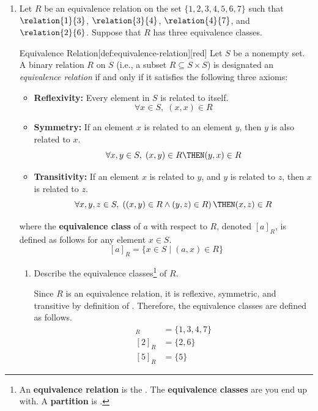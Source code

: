 \begin{enumerate}
  \newpage
  \item Let $R$ be an equivalence relation on the set $\{1,2,3,4,5,6,7\}$ 
  such that $\relation{1}{3}$, $\relation{3}{4}$, $\relation{4}{7}$, and 
  $\relation{2}{6}$. Suppose that $R$ has three equivalence classes.
  \begin{define}{Equivalence Relation}[def:equivalence-relation][red]
    Let $S$ be a nonempty set. A binary relation $R$ on $S$ (i.e., a subset $R \subseteq S \times S$) is designated an \emph{equivalence relation} if and only if it satisfies the following three axioms:
    \begin{itemize}
      \item \textbf{Reflexivity:} Every element in $S$ is related to itself.
        $$ \forall x \in S, \; (x,x) \in R $$
      \item \textbf{Symmetry:} If an element $x$ is related to an element $y$, then $y$ is also related to $x$.
        $$ \forall x,y \in S, \; (x,y) \in R \THEN (y,x) \in R $$
      \item \textbf{Transitivity:} If an element $x$ is related to $y$, and $y$ is related to $z$, then $x$ is related to $z$.
        $$ \forall x,y,z \in S, \; \left( (x,y) \in R \land (y,z) \in R \right) \THEN (x,z) \in R $$
    \end{itemize}
    where the \textbf{equivalence class} of $a$ with respect to $R$, denoted $[a]_R$, is defined 
    as follows for any element $x \in S$. 
    $$
    [a]_R = \{x \in S \mid (a,x) \in R \}
    $$
  \end{define} 
  \begin{enumerate}
    \item Describe the equivalence classes\footnote{
      An \textbf{equivalence relation} is the . 
      The \textbf{equivalence classes} are  you end up with. 
      A \textbf{partition} is .
    } of $R$.
      \begin{subanswer}
        Since $R$ is an equivalence relation, it is reflexive, symmetric, and 
        transitive by definition of .
        Therefore, the equivalence classes are defined as follows.
        \begin{align*}
          [1]_R &= \{1,3,4,7\} \\
          [2]_R &= \{2,6\} \\
          [5]_R &= \{5\}
        \end{align*}

\end{subanswer}
\end{enumerate}
\end{enumerate}
